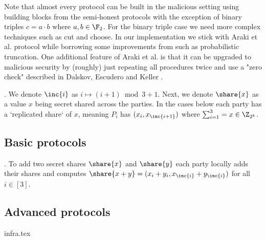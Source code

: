 Note that almost every protocol can be built in the malicious setting using
building blocks from the semi-honest protocols with the exception of binary
triples $c = a \cdot b$ where $a,b \in \F_2$. For the binary triple case we
need more complex techniques such as cut and choose. In our implementation we
stick with Araki et al. protocol \cite{CCS:AFLNO16} while borrowing some
improvements from \cite{cryptoeprint:2020:1330} such as probabilistic
truncation. One additional feature of Araki et al. \cite{CCS:AFLNO16} is that
it can be upgraded to malicious security by (roughly) just repeating all
procedures twice and use a "zero check" described in Dalskov, Escudero and
Keller \cite{cryptoeprint:2020:1330}.

. We denote $\inc{i}$ as $i \mapsto (i+1) \bmod 3 + 1$.
Next, we denote $\share{x}$ as a value $x$ being secret shared
across the parties. In the cases below each party has a `replicated share` of
$x$, meaning $P_i$ has $(x_i, x_{ \inc{i+1} })$ where $\sum_{i=1}^3 = x
\in \Z_{2^k}$.

\subsection{Basic protocols}
. To add two secret shares $\share{x}$ and $\share{y}$
each party locally adds their shares and computes $\share{x+y} =
(x_i + y_i, x_{\inc{i}} + y_{\inc{i}})$ for all $i \in [3]$.






\subsection{Advanced protocols}




{infra.tex}

